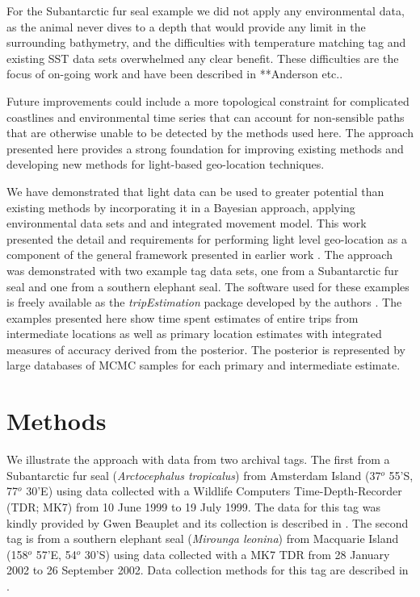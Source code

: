 \documentclass[10pt]{article}
\begin{document}
For the Subantarctic fur seal example we did not apply any
environmental data, as the animal never dives to a depth that would
provide any limit in the surrounding bathymetry, and the difficulties
with temperature matching tag and existing SST data sets overwhelmed
any clear benefit. These difficulties are the focus of on-going work
and have been described in **Anderson etc..

Future improvements could include a more topological constraint for
complicated coastlines and environmental time series that can account
for non-sensible paths that are otherwise unable to be detected by the
methods used here. The approach presented here provides a strong
foundation for improving existing methods and developing new methods
for light-based geo-location techniques.


We have demonstrated that light data can be used to greater potential
than existing methods by incorporating it in a Bayesian approach,
applying environmental data sets and and integrated movement
model. This work presented the detail and requirements for performing
light level geo-location as a component of the general framework
presented in earlier work \cite{sumner2009}.  The approach was
demonstrated with two example tag data sets, one from a Subantarctic
fur seal and one from a southern elephant seal. The software used for
these examples is freely available as the \emph{tripEstimation}
package developed by the authors \cite{tripEstimation}. The examples
presented here show time spent estimates of entire trips from
intermediate locations as well as primary location estimates with
integrated measures of accuracy derived from the posterior. The
posterior is represented by large databases of MCMC samples for each
primary and intermediate estimate.


\section*{Methods}

We illustrate the approach with data from two archival tags. The first
from a Subantarctic fur seal (\emph{Arctocephalus tropicalus}) from
Amsterdam Island (37$^o$ 55'S, 77$^o$ 30'E) using data collected with
a Wildlife Computers Time-Depth-Recorder (TDR; MK7) from 10 June 1999
to 19 July 1999. The data for this tag was kindly provided by Gwen
Beauplet and its collection is described in \cite{Beauplet2004}.  The
second tag is from a southern elephant seal (\emph{Mirounga leonina})
from Macquarie Island (158$^o$ 57'E, 54$^o$ 30'S) using data collected
with a MK7 TDR from 28 January 2002 to 26 September 2002. Data
collection methods for this tag are described in \cite{BHMS02}.
\end{document}
